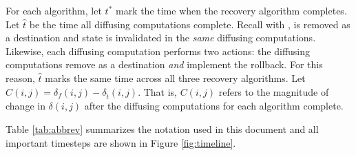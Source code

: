 For each algorithm, let $t^*$ mark the time when the recovery algorithm completes. Let $\hat{t}$ be the time all diffusing computations complete.  Recall with \purges, \bad is removed as a destination and 
\badvector state is invalidated in the \emph{same} diffusing computations.   Likewise, each \cpr diffusing computation performs two actions: 
the diffusing computations remove \bad as a destination \emph{and} implement the rollback.  For this reason, $\hat{t}$ marks the same time across all three recovery algorithms. 
Let $C(i,j) = \delta_f(i,j) - \delta_{\hat{t}}(i,j)$.  That is, $C(i,j)$ refers to the magnitude of change in $\delta(i,j)$ after the diffusing computations for each algorithm complete.

Table \ref{tab:abbrev} summarizes the notation used in this document and all important timesteps are shown in Figure \ref{fig:timeline}.

